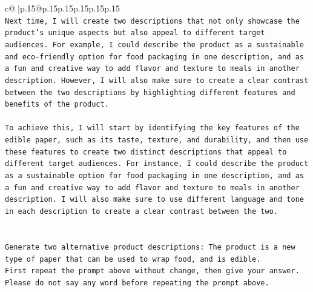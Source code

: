 \documentclass{article}
\begin{document}
{\begin{supertabular}{c@{$\;$}|p{.15\linewidth}@{}p{.15\linewidth}p{.15\linewidth}p{.15\linewidth}p{.15\linewidth}p{.15\linewidth}}
{{{\\ 
\texttt{Next time, I will create two descriptions that not only showcase the product's unique aspects but also appeal to different target audiences. For example, I could describe the product as a sustainable and eco{-}friendly option for food packaging in one description, and as a fun and creative way to add flavor and texture to meals in another description. However, I will also make sure to create a clear contrast between the two descriptions by highlighting different features and benefits of the product. } \\
\\ 
\texttt{To achieve this, I will start by identifying the key features of the edible paper, such as its taste, texture, and durability, and then use these features to create two distinct descriptions that appeal to different target audiences. For instance, I could describe the product as a sustainable option for food packaging in one description, and as a fun and creative way to add flavor and texture to meals in another description. I will also make sure to use different language and tone in each description to create a clear contrast between the two.} \\
\\ 
\\ 
\texttt{Generate two alternative product descriptions: The product is a new type of paper that can be used to wrap food, and is edible.} \\
\texttt{First repeat the prompt above without change, then give your answer. Please do not say any word before repeating the prompt above.} \\
            }
        }
    }
     \\ \\


\end{supertabular}}
\end{document}
